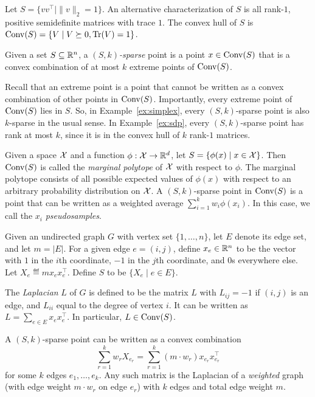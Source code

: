 \documentclass[paper.tex]{subfiles}
\begin{document}
\begin{example}
\label{ex:sdp}
Let $S = \{vv^{\top} \mid \|v\|_2 = 1\}$. An alternative characterization 
of $S$ is all rank-$1$, positive semidefinite matrices with trace $1$. The 
convex hull of $S$ is $\operatorname{Conv}(S) = \{V \mid V \succeq 0, \operatorname{Tr}(V) = 1\}$.
\end{example}

\begin{definition}
Given a set $S \subseteq \mathbb{R}^n$, a \emph{$(S, k)$-sparse} point is a point 
$x \in \operatorname{Conv}(S)$ that is a convex combination of at most $k$ extreme 
points of $\operatorname{Conv}(S)$.
\end{definition}

Recall that an extreme point is a point that cannot be written as a convex 
combination of other points in $\operatorname{Conv}(S)$. Importantly, every extreme point 
of $\operatorname{Conv}(S)$ lies in $S$. So, in Example~\ref{ex:simplex}, every 
$(S,k)$-sparse point is also $k$-sparse in the usual sense. In 
Example~\ref{ex:sdp}, every $(S,k)$-sparse point has rank at most $k$, since 
it is in the convex hull of $k$ rank-$1$ matrices.

\begin{example}
\label{ex:marginal-polytope}
Given a space $\mathcal{X}$ and a function $\phi : \mathcal{X} \to \mathbb{R}^d$, let 
$S = \{\phi(x) \mid x \in \mathcal{X}\}$. Then $\operatorname{Conv}(S)$ is called the 
\emph{marginal polytope} of $\mathcal{X}$ with respect to $\phi$. The 
marginal polytope consists of all possible expected values of 
$\phi(x)$ with respect to an arbitrary probability distribution 
on $\mathcal{X}$. A $(S,k)$-sparse point in $\operatorname{Conv}(S)$ is a point that 
can be written as a weighted average $\sum_{i=1}^k w_i \phi(x_i)$. 
In this case, we call the $x_i$ \emph{pseudosamples}.
\end{example}

\begin{example}
\label{ex:graph}
Given an undirected graph $G$ with vertex set $\{1,\ldots,n\}$, let $E$ 
denote its edge set, and let $m = |E|$. For a given 
edge $e = (i,j)$, define $x_e \in \mathbb{R}^n$ to be the vector with 
$1$ in the $i$th coordinate, $-1$ in the $j$th coordinate, and 
$0$s everywhere else. Let $X_e \eqdef mx_ex_e^{\top}$. 
Define $S$ to be $\{X_e \mid e \in E\}$.

The \emph{Laplacian} $L$ of $G$ is defined to be the matrix $L$ 
with $L_{ij} = -1$ if $(i,j)$ is an edge, and $L_{ii}$ equal to 
the degree of vertex $i$. It can be written as $L = \sum_{e \in E} x_ex_e^{\top}$. 
In particular, $L \in \operatorname{Conv}(S)$.

A $(S,k)$-sparse point can be written as a convex combination 
\[ \sum_{r=1}^k w_rX_{e_r} = \sum_{r=1}^k (m\cdot w_r)x_{e_r}x_{e_r}^{\top} \]
for some $k$ edges $e_1,\ldots,e_k$. Any such matrix is the Laplacian 
of a \emph{weighted} graph (with edge weight $m\cdot w_r$ on edge $e_r$) 
with $k$ edges and total edge weight $m$.
\end{example}
\end{document}
